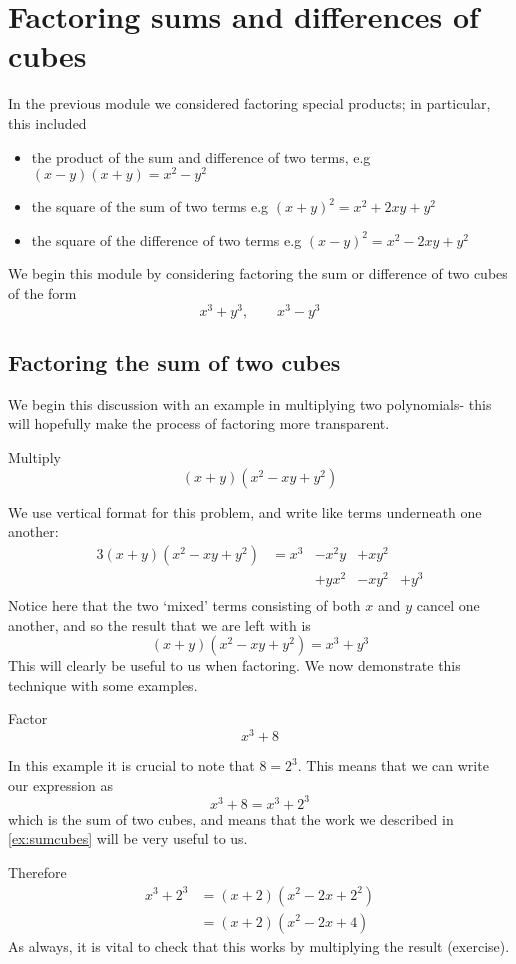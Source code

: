 \section{Factoring sums and differences of cubes}
In the previous module we considered factoring special products; in particular, this 
included
\begin{itemize}
	\item the product of the sum and difference of two terms, e.g $(x-y)(x+y)=x^2-y^2$
	\item the square of the sum of two terms e.g $(x+y)^2=x^2+2xy+y^2$
	\item the square of the difference of two terms e.g $(x-y)^2=x^2-2xy+y^2$
\end{itemize} 
We begin this module by considering factoring the sum or difference of two cubes of the form
\[
	x^3+y^3, \qquad  x^3-y^3
\]

\subsection{Factoring the sum of two cubes}
We begin this discussion with an example in multiplying two polynomials- this will hopefully
make the process of factoring more transparent.

\begin{myexample}\label{ex:sumcubes}
Multiply 
\[
	(x+y)(x^2-xy+y^2)
\]
\end{myexample}
\begin{myProof}
	We use vertical format for this problem, and write like terms underneath one another:
	\begin{alignat*}{3}
		(x+y)(x^2-xy+y^2) & =  x^3 & -x^2y & +xy^2 &      \\
		                  &        & +yx^2 & -xy^2 & +y^3 \\
	\end{alignat*}
	Notice here that the two `mixed' terms consisting of both $x$ and $y$ cancel one another, 
	and so the result that we are left with is
	\[
		(x+y)(x^2-xy+y^2) = x^3+y^3
	\]  
	This will clearly be useful to us when factoring. We now demonstrate this technique with some examples.
\end{myProof} 

\begin{myexample}
Factor
\[
	x^3+8
\]
\end{myexample}
\begin{myProof}
	In this example it is crucial to note that $8=2^3$. This means that we can write our \gls{expression}
	as
	\[
		x^3 +8 = x^3 + 2^3
	\]
	which is the sum of two cubes, and means that the work we described in \cref{ex:sumcubes}
	will be very useful to us. 
				
	Therefore
	\begin{align*}
		x^3+2^3 & =  (x+2)(x^2-2x+2^2) \\
		        & =  (x+2)(x^2-2x+4)   
	\end{align*} 
	As always, it is vital to check that this works by multiplying the result (exercise).
\end{myProof} 

